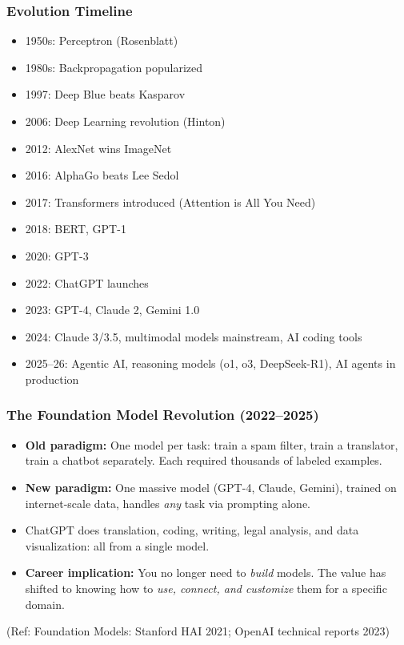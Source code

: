 \begin{frame}[fragile]\frametitle{Evolution Timeline}
\begin{itemize}
\item 1950s: Perceptron (Rosenblatt)
\item 1980s: Backpropagation popularized
\item 1997: Deep Blue beats Kasparov
\item 2006: Deep Learning revolution (Hinton)
\item 2012: AlexNet wins ImageNet
\item 2016: AlphaGo beats Lee Sedol
\item 2017: Transformers introduced (Attention is All You Need)
\item 2018: BERT, GPT-1
\item 2020: GPT-3
\item 2022: ChatGPT launches
\item 2023: GPT-4, Claude 2, Gemini 1.0
\item 2024: Claude 3/3.5, multimodal models mainstream, AI coding tools
\item 2025--26: Agentic AI, reasoning models (o1, o3, DeepSeek-R1), AI agents in production
\end{itemize}
\end{frame}


\begin{frame}[fragile]\frametitle{The Foundation Model Revolution (2022--2025)}
\begin{itemize}
\item \textbf{Old paradigm:} One model per task: train a spam filter, train a translator, train a chatbot separately. Each required thousands of labeled examples.
\item \textbf{New paradigm:} One massive model (GPT-4, Claude, Gemini), trained on internet-scale data, handles \textit{any} task via prompting alone.
\item ChatGPT does translation, coding, writing, legal analysis, and data visualization: all from a single model.
\item \textbf{Career implication:} You no longer need to \textit{build} models. The value has shifted to knowing how to \textit{use, connect, and customize} them for a specific domain.
\end{itemize}
{\tiny (Ref: Foundation Models: Stanford HAI 2021; OpenAI technical reports 2023)}
\end{frame}

